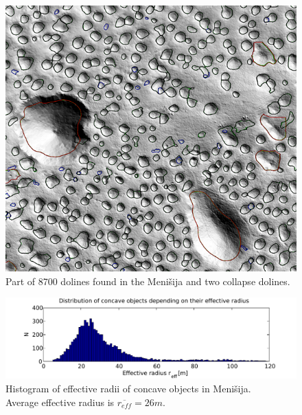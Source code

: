 \documentclass[a0,portrait]{a0poster}
\begin{document}
\begin{multicols}{2}
  \begin{minipage}[b]{0.5\textwidth}
      \begin{minipage}{0.2\linewidth}
          \begin{figure}[H]
              \includegraphics[width=\textwidth]{menisija-vrtace}
              \caption{Part of 8700 dolines found in the Menišija and two collapse dolines.}
              \label{fig:vrtaceinpolmeri}
          \end{figure}
      \end{minipage}
      \begin{minipage}{0.83\linewidth}
          \begin{figure}[H]
              \includegraphics[width=\textwidth]{menisija-polmeri-hist-2}
              \caption{Histogram of effective radii of concave objects in Menišija. \\Average effective radius is $\overline{r_{eff}} = 26m$.}
              \label{fig:vrtave-histogram}
          \end{figure}
      \end{minipage}
  \end{minipage}


\end{multicols}
\end{document}
